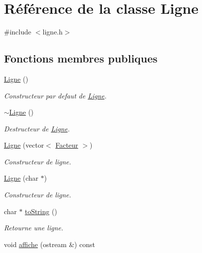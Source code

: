 \hypertarget{classLigne}{
\section{Référence de la classe Ligne}
\label{classLigne}
}


{\ttfamily \#include $<$ligne.h$>$}

\subsection*{Fonctions membres publiques}
\begin{DoxyCompactItemize}
\item 
\hypertarget{classLigne_aa8953c4b617add4054ed9f73b36995b7}{
\hyperlink{classLigne_aa8953c4b617add4054ed9f73b36995b7}{Ligne} ()}
\label{classLigne_aa8953c4b617add4054ed9f73b36995b7}

\begin{DoxyCompactList}\small\item\em Constructeur par defaut de \hyperlink{classLigne}{Ligne}. \item\end{DoxyCompactList}\item 
\hypertarget{classLigne_a7496e90cf05bab745e3645919d33c811}{
\hyperlink{classLigne_a7496e90cf05bab745e3645919d33c811}{$\sim$Ligne} ()}
\label{classLigne_a7496e90cf05bab745e3645919d33c811}

\begin{DoxyCompactList}\small\item\em Destructeur de \hyperlink{classLigne}{Ligne}. \item\end{DoxyCompactList}\item 
\hyperlink{classLigne_a7065d8ee1a96e034b1c6ccb2381ef767}{Ligne} (vector$<$ \hyperlink{classFacteur}{Facteur} $>$)
\begin{DoxyCompactList}\small\item\em Constructeur de ligne. \item\end{DoxyCompactList}\item 
\hypertarget{classLigne_ad04b7ec786a0a860d41c842570b4f1da}{
\hyperlink{classLigne_ad04b7ec786a0a860d41c842570b4f1da}{Ligne} (char $\ast$)}
\label{classLigne_ad04b7ec786a0a860d41c842570b4f1da}

\begin{DoxyCompactList}\small\item\em Constructeur de ligne. \item\end{DoxyCompactList}\item 
char $\ast$ \hyperlink{classLigne_ac50b7665f6259fd0eb8f00dca6142bba}{toString} ()
\begin{DoxyCompactList}\small\item\em Retourne une ligne. \item\end{DoxyCompactList}\item 
\hypertarget{classLigne_a283b2e758aec620553e4df9ed9e20fd2}{
void \hyperlink{classLigne_a283b2e758aec620553e4df9ed9e20fd2}{affiche} (ostream \&) const }
\label{classLigne_a283b2e758aec620553e4df9ed9e20fd2}


\end{DoxyCompactItemize}
